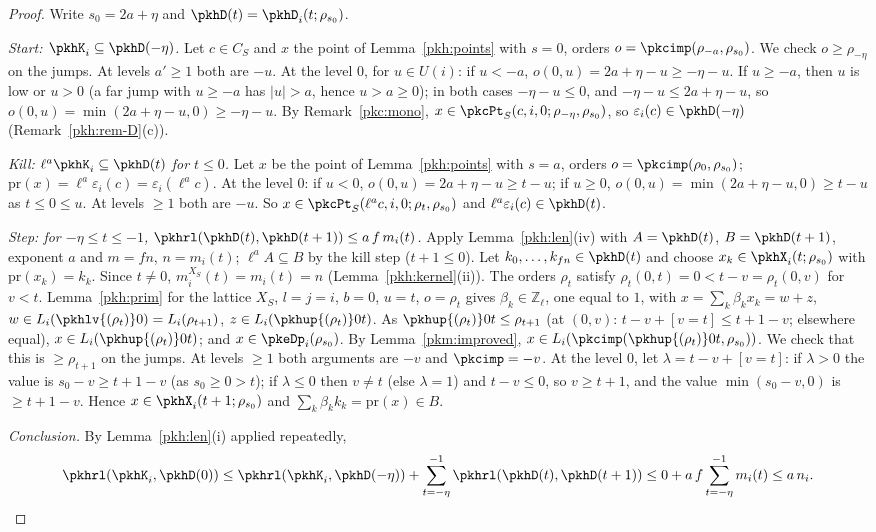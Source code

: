 \documentclass[10pt]{amsart}
\theoremstyle{definition}
\theoremstyle{remark}
\newcommand{\Z}{\mathbb Z}
\begin{document}
\begin{proof}
Write $s_0=2a+\eta$ and $\pkhD(t)=\pkhD_i(t;\rho_{s_0})$.

\emph{Start: $\pkhK_i\subseteq\pkhD(-\eta)$.} Let $c\in C_S$ and $x$ the point of Lemma~\ref{pkh:points} with
$s=0$, orders $o=\pkcimp(\rho_{-a},\rho_{s_0})$. We check $o\ge\rho_{-\eta}$ on the jumps. At levels $a'\ge1$
both are $-u$. At the level $0$, for $u\in U(i)$: if $u<-a$, $o(0,u)=2a+\eta-u\ge-\eta-u$. If $u\ge-a$, then
$u$ is low or $u>0$ (a far jump with $u\ge-a$ has $|u|>a$, hence $u>a\ge0$); in both cases $-\eta-u\le0$, and
$-\eta-u\le2a+\eta-u$, so $o(0,u)=\min(2a+\eta-u,0)\ge-\eta-u$. By Remark~\ref{pkc:mono}, $x\in\pkcPt_S(c,i,0;
\rho_{-\eta},\rho_{s_0})$, so $\varepsilon_i(c)\in\pkhD(-\eta)$ (Remark~\ref{pkh:rem-D}(c)).

\emph{Kill: $\ell^a\pkhK_i\subseteq\pkhD(t)$ for $t\le0$.} Let $x$ be the point of Lemma~\ref{pkh:points} with
$s=a$, orders $o=\pkcimp(\rho_0,\rho_{s_0})$; $\mathrm{pr}(x)=\ell^a\varepsilon_i(c)=\varepsilon_i(\ell^ac)$. At
the level $0$: if $u<0$, $o(0,u)=2a+\eta-u\ge t-u$; if $u\ge0$, $o(0,u)=\min(2a+\eta-u,0)\ge t-u$ as $t\le0\le
u$. At levels $\ge1$ both are $-u$. So $x\in\pkcPt_S(\ell^ac,i,0;\rho_t,\rho_{s_0})$ and
$\ell^a\varepsilon_i(c)\in\pkhD(t)$.

\emph{Step: for $-\eta\le t\le-1$, $\pkhrl(\pkhD(t),\pkhD(t+1))\le a\,f\,m_i(t)$.} Apply
Lemma~\ref{pkh:len}(iv) with $A=\pkhD(t)$, $B=\pkhD(t+1)$, exponent $a$ and $m=fn$, $n=m_i(t)$; $\ell^aA\subseteq
B$ by the kill step ($t+1\le0$). Let $k_0,\dots,k_{fn}\in\pkhD(t)$ and choose $x_k\in\pkhX_i(t;\rho_{s_0})$ with
$\mathrm{pr}(x_k)=k_k$. Since $t\ne0$, $m^{X_S}_i(t)=m_i(t)=n$ (Lemma~\ref{pkh:kernel}(ii)). The orders
$\rho_t$ satisfy $\rho_t(0,t)=0<t-v=\rho_t(0,v)$ for $v<t$. Lemma~\ref{pkh:prim} for the lattice $X_S$,
$l=j=i$, $b=0$, $u=t$, $o=\rho_t$ gives $\beta_k\in\Z_\ell$, one equal to $1$, with $x=\sum_k\beta_kx_k=w+z$,
$w\in L_i(\pkhlv{(\rho_t)}0)=L_i(\rho_{t+1})$, $z\in L_i(\pkhup{(\rho_t)}0t)$. As $\pkhup{(\rho_t)}0t\le\rho_{t+1}$
(at $(0,v)$: $t-v+[v=t]\le t+1-v$; elsewhere equal), $x\in L_i(\pkhup{(\rho_t)}0t)$; and $x\in\pkeDp_i(\rho_{s_0})$.
By Lemma~\ref{pkm:improved}, $x\in L_i(\pkcimp(\pkhup{(\rho_t)}0t,\rho_{s_0}))$. We check that this is $\ge
\rho_{t+1}$ on the jumps. At levels $\ge1$ both arguments are $-v$ and $\pkcimp=-v$. At the level $0$, let
$\lambda=t-v+[v=t]$: if $\lambda>0$ the value is $s_0-v\ge t+1-v$ (as $s_0\ge0>t$); if $\lambda\le0$ then
$v\ne t$ (else $\lambda=1$) and $t-v\le0$, so $v\ge t+1$, and the value $\min(s_0-v,0)$ is $\ge t+1-v$. Hence
$x\in\pkhX_i(t+1;\rho_{s_0})$ and $\sum_k\beta_kk_k=\mathrm{pr}(x)\in B$.

\emph{Conclusion.} By Lemma~\ref{pkh:len}(i) applied repeatedly,
\[
\pkhrl(\pkhK_i,\pkhD(0))\le\pkhrl(\pkhK_i,\pkhD(-\eta))+\sum_{t=-\eta}^{-1}\pkhrl(\pkhD(t),\pkhD(t+1))\le
0+a\,f\sum_{t=-\eta}^{-1}m_i(t)\le a\,n_i.\qedhere
\]
\end{proof}
\end{document}
